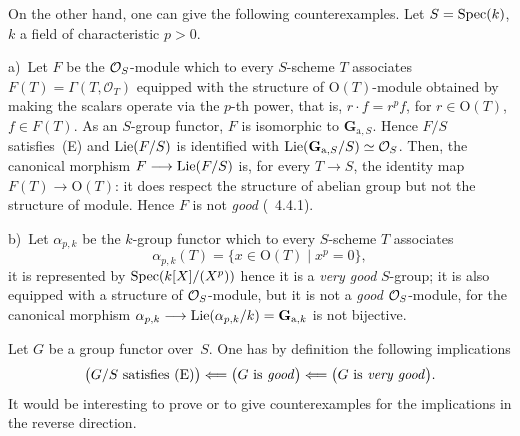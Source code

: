 {\renewcommand{\thefootnote}{(102)}}%
On the other hand, one can give the following counterexamples. Let
\(S=\operatorname{Spec}(k)\), \(k\) a field of characteristic \(p>0\).

a)~Let \(F\) be the \(\mathcal{O}_S\)-module which to every \(S\)-scheme \(T\)
associates \(F(T)=\Gamma(T,\mathcal{O}_T)\) equipped with the structure of
\(\mathrm{O}(T)\)-module obtained by making the scalars operate via the
\(p\)-th power, that is, \(r\cdot f=r^{p}f\), for \(r\in\mathrm{O}(T)\),
\(f\in F(T)\). As an \(S\)-group functor, \(F\) is isomorphic to
\(\mathbf{G}_{\mathrm{a},S}\). Hence \(F/S\) satisfies~(E) and
\(\operatorname{Lie}(F/S)\) is identified with
\(\operatorname{Lie}(\mathbf{G}_{\mathrm{a},S}/S)\simeq\mathcal{O}_S\). Then, the canonical
morphism \(F\longrightarrow\operatorname{Lie}(F/S)\) is,
for every \(T\to S\), the identity map \(F(T)\to\mathrm{O}(T)\): it does
respect the structure of abelian group but not the structure of module.
Hence \(F\) is not \emph{good} (\cf~4.4.1).

b)~Let \(\alpha_{p,k}\) be the \(k\)-group functor which to every
\(S\)-scheme \(T\) associates
\[
\alpha_{p,k}(T)=\{x\in\mathrm{O}(T)\mid x^{p}=0\},
\]
it is represented by \(\operatorname{Spec}(k[X]/(X^{p}))\) hence it is a \emph{very good}
\(S\)-group; it is also equipped with a structure of \(\mathcal{O}_S\)-module, but it
is not a \emph{good} \(\mathcal{O}_S\)-module, for the canonical morphism
\(\alpha_{p,k}\longrightarrow\operatorname{Lie}(\alpha_{p,k}/k)=\mathbf{G}_{\mathrm{a},k}\) is not
bijective.

\label{II.6.4}
Let \(G\) be a group functor over~\(S\). One has by definition the following
implications
\[
\bigl(G/S\text{ satisfies~(E)}\bigr)
\Longleftarrow
\bigl(G\text{ is \emph{good}}\bigr)
\Longleftarrow
\bigl(G\text{ is \emph{very good}}\bigr).
\]
{\renewcommand{\thefootnote}{(103)}}
It would be interesting to prove or to give counterexamples for the
implications in the reverse direction.

